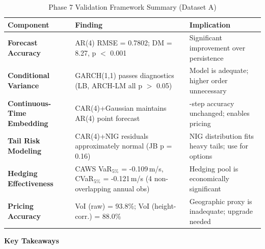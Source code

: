 \documentclass[11pt, a4paper, twoside]{article}
\begin{document}
\begin{table}[ht]
\centering
\caption{Phase 7 Validation Framework Summary (Dataset A)}
\label{tbl:phase7_summary}
\small
\begin{tabularx}{0.95\textwidth}{l >{\raggedright\arraybackslash}X >{\raggedright\arraybackslash}X}
\toprule
\textbf{Component} & \textbf{Finding} & \textbf{Implication} \\
\midrule
\textbf{Forecast Accuracy} & AR(4) RMSE = 0.7802; DM = 8.27, p $<$ 0.001 & Significant improvement over persistence \\
\textbf{Conditional Variance} & GARCH(1,1) passes diagnostics (LB, ARCH-LM all p $>$ 0.05) & Model is adequate; higher order unnecessary \\
\textbf{Continuous-Time Embedding} & CAR(4)+Gaussian maintains AR(4) point forecast & 1-step accuracy unchanged; enables pricing \\
\textbf{Tail Risk Modeling} & CAR(4)+NIG residuals approximately normal (JB p = 0.16) & NIG distribution fits heavy tails; use for options \\
\textbf{Hedging Effectiveness} & CAWS VaR$_{5\%}$ = -0.109\,m/s, CVaR$_{5\%}$ = -0.121\,m/s (4 non-overlapping annual obs) & Hedging pool is economically significant \\
\textbf{Pricing Accuracy} & VoI (raw) = 93.8\%; VoI (height-corr.) = 88.0\% & Geographic proxy is inadequate; upgrade needed \\
\bottomrule
\end{tabularx}
\end{table}

\textbf{Key Takeaways}
\end{document}
